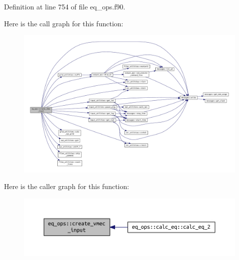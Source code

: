 Definition at line 754 of file eq\+\_\+ops.\+f90.

Here is the call graph for this function\+:\nopagebreak
\begin{figure}[H]
\begin{center}
\leavevmode
\includegraphics[width=350pt]{namespaceeq__ops_a9addef683b3d4a8c587510e4c994ec61_cgraph}
\end{center}
\end{figure}
Here is the caller graph for this function\+:\nopagebreak
\begin{figure}[H]
\begin{center}
\leavevmode
\includegraphics[width=350pt]{namespaceeq__ops_a9addef683b3d4a8c587510e4c994ec61_icgraph}
\end{center}
\end{figure}
\mbox{\label{namespaceeq__ops_ac0a79893900631d25b170be0abd2c131}} 

